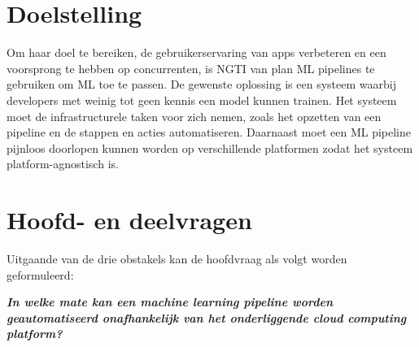 


\section{Doelstelling}\label{sec:ch2-doelstelling}
Om haar doel te bereiken, de gebruikerservaring van apps verbeteren en een voorsprong te hebben op concurrenten, is NGTI van plan ML pipelines te gebruiken om ML toe te passen. De gewenste oplossing is een systeem waarbij developers met weinig tot geen kennis een model kunnen trainen. Het systeem moet de infrastructurele taken voor zich nemen, zoals het opzetten van een pipeline en de stappen en acties automatiseren. Daarnaast moet een ML pipeline pijnloos doorlopen kunnen worden op verschillende platformen zodat het systeem platform-agnostisch is.

\section{Hoofd- en deelvragen}\label{sec:ch2-hoofd-en-deelvragen}
Uitgaande van de drie obstakels kan de hoofdvraag als volgt worden geformuleerd:

\begin{quoting}
  \begin{center}
    \textbf{
      \textit{
        In welke mate kan een machine learning pipeline worden geautomatiseerd onafhankelijk van het onderliggende cloud computing platform?
      }
    }
  \end{center}
\end{quoting}\smallskip


